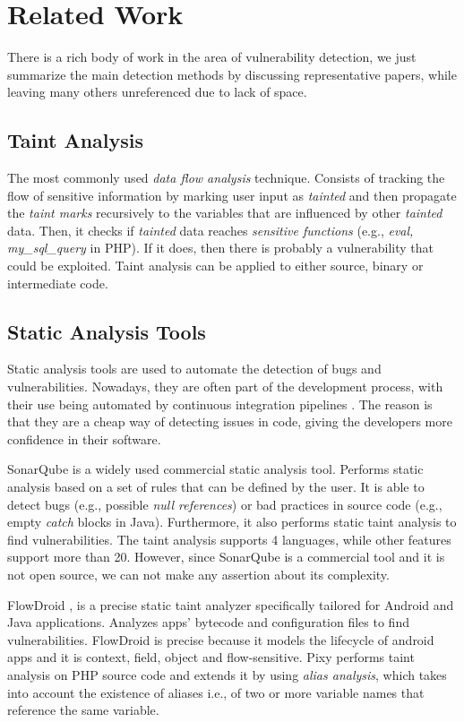 \section{Related Work}
\label{relatedwork}
There is a rich body of work in the area of vulnerability detection, we just summarize the main detection methods by discussing representative papers, while leaving many others unreferenced due to lack of space. 

\subsection{Taint Analysis}
The most commonly used \textit{data flow analysis} technique. Consists of tracking the flow of sensitive information by marking user input as \textit{tainted} and then propagate the \textit{taint marks} recursively to the variables that are influenced by other \textit{tainted} data. Then, it checks if \textit{tainted} data reaches \textit{sensitive functions} (e.g., \textit{eval, my\_sql\_query} in PHP). If it does, then there is probably a vulnerability that could be exploited. Taint analysis can be applied to either source, binary or intermediate code. 



\subsection{Static Analysis Tools}
Static analysis tools are used to automate the detection of bugs and vulnerabilities. Nowadays, they are often part of the development process, with their use being automated by continuous integration pipelines \cite{mohammad2016continuous}. The reason is that they are a cheap way of detecting issues in code, giving the developers more confidence in their software. 


SonarQube \cite{campbell2013sonarqube} is a widely used commercial static analysis tool. Performs static analysis based on a set of rules that can be defined by the user. It is able to detect bugs (e.g., possible \textit{null references}) or bad practices in source code (e.g., empty \textit{catch} blocks in Java). Furthermore, it also performs static taint analysis to find vulnerabilities. The taint analysis supports 4 languages, while other features support more than 20. However, since SonarQube is a commercial tool and it is not open source, we can not make any assertion about its complexity. 

FlowDroid \cite{arzt2014flowdroid}, is a precise static taint analyzer specifically tailored for Android and Java applications. Analyzes apps' bytecode and configuration files to find vulnerabilities. FlowDroid is precise because it models the lifecycle of android apps and it is context, field, object and flow-sensitive. Pixy \cite{jovanovic2006pixy} performs taint analysis on PHP source code and extends it by using \textit{alias analysis}, which takes into account the existence of aliases i.e., of two or more variable names that reference the same variable.


